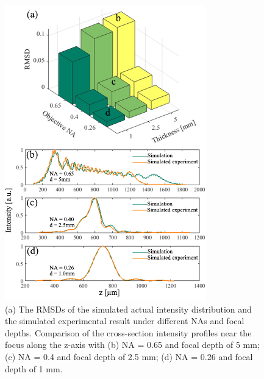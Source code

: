 \documentclass[9pt,twocolumn,twoside]{osajnl}
\begin{document}
\begin{figure}[ht]
	\centering
	\includegraphics[width=\linewidth]{SEvsS.pdf}
	\caption{(a) The RMSDs of the simulated actual intensity distribution and the simulated experimental result under different NAs and focal depths. Comparison of the cross-section intensity profiles near the focus along the z-axis with (b) NA = 0.65 and focal depth of 5 mm; (c) NA = 0.4 and focal depth of 2.5 mm; (d) NA = 0.26 and focal depth of 1 mm.}\label{fig:6}
\end{figure}
\end{document}

